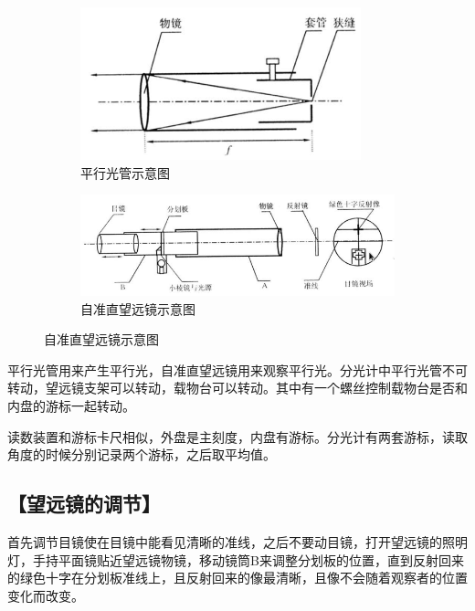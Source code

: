 \documentclass{ctexart}
\let\oldsubsection\subsection
\renewcommand{\subsection}[1]{\oldsubsection{\!\!\!\!\!\!【#1】}}
\begin{document}
\begin{figure}[H]
  \centering
  \begin{subfigure}{.35\textwidth}
    \centering
    \includegraphics[width=\linewidth]{figures/平行光管示意图}
    \caption{平行光管示意图}
  \end{subfigure}
  \begin{subfigure}{.6\textwidth}
    \centering
    \includegraphics[width=\linewidth]{figures/自准直望远镜示意图}
    \caption{自准直望远镜示意图}
  \end{subfigure}
\end{figure}

平行光管用来产生平行光，自准直望远镜用来观察平行光。分光计中平行光管不可转动，望远镜支架可以转动，载物台可以转动。其中有一个螺丝控制载物台是否和内盘的游标一起转动。

读数装置和游标卡尺相似，外盘是主刻度，内盘有游标。分光计有两套游标，读取角度的时候分别记录两个游标，之后取平均值。

\subsection{望远镜的调节}

首先调节目镜使在目镜中能看见清晰的准线，之后不要动目镜，打开望远镜的照明灯，手持平面镜贴近望远镜物镜，移动镜筒B来调整分划板的位置，直到反射回来的绿色十字在分划板准线上，且反射回来的像最清晰，且像不会随着观察者的位置变化而改变。
\end{document}
